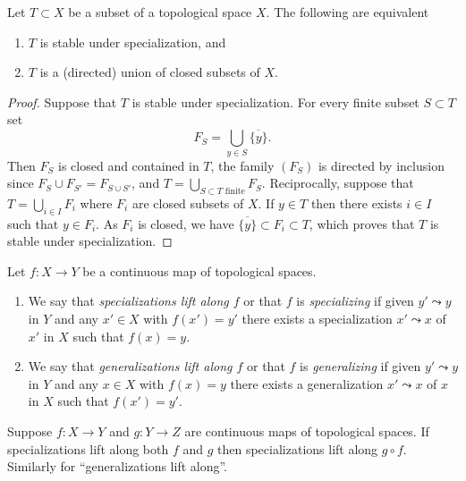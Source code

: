 \begin{lemma}
\label{lemma-stable-specialization}
Let $T \subset X$ be a subset of a topological space $X$.
The following are equivalent
\begin{enumerate}
\item $T$ is stable under specialization, and
\item $T$ is a (directed) union of closed subsets of $X$.
\end{enumerate}
\end{lemma}

\begin{proof}
Suppose that $T$ is stable under specialization. For every finite subset
$S \subset T$ set
$$
F_S = \bigcup_{y \in S} \overline{\{y\}}.
$$
Then $F_S$ is closed and contained in $T$, the family $(F_S)$ is directed
by inclusion since $F_S \cup F_{S'} = F_{S \cup S'}$, and
$T = \bigcup_{S \subset T\text{ finite}} F_S$.
Reciprocally, suppose that $T =
\bigcup_{i\in I}F_i$ where $F_i$ are closed subsets of $X$. If $y\in T$ then
there exists $i\in I$ such that $y\in F_i$. As $F_i$ is closed, we have
$\overline{\{y\}} \subset F_i \subset T$, which proves that $T$ is stable under
specialization.
\end{proof}

\begin{definition}
\label{definition-lift-specializations}
Let $f : X \to Y$ be a continuous map of topological spaces.
\begin{enumerate}
\item We say that {\it specializations lift along $f$} or that $f$ is
{\it specializing} if given $y' \leadsto y$ in $Y$ and any $x'\in X$ with
$f(x') = y'$ there exists a specialization $x' \leadsto x$ of $x'$ in $X$ such
that $f(x) = y$.
\item We say that {\it generalizations lift along $f$} or that $f$ is
{\it generalizing} if given $y' \leadsto y$ in $Y$ and any $x\in X$ with
$f(x) = y$ there exists a generalization $x' \leadsto x$ of $x$ in $X$ such
that $f(x') = y'$.
\end{enumerate}
\end{definition}

\begin{lemma}
\label{lemma-lift-specialization-composition}
Suppose $f : X \to Y$ and $g : Y \to Z$ are continuous maps
of topological spaces. If specializations lift along both $f$ and $g$
then specializations lift along $g \circ f$. Similarly for
``generalizations lift along''.
\end{lemma}

